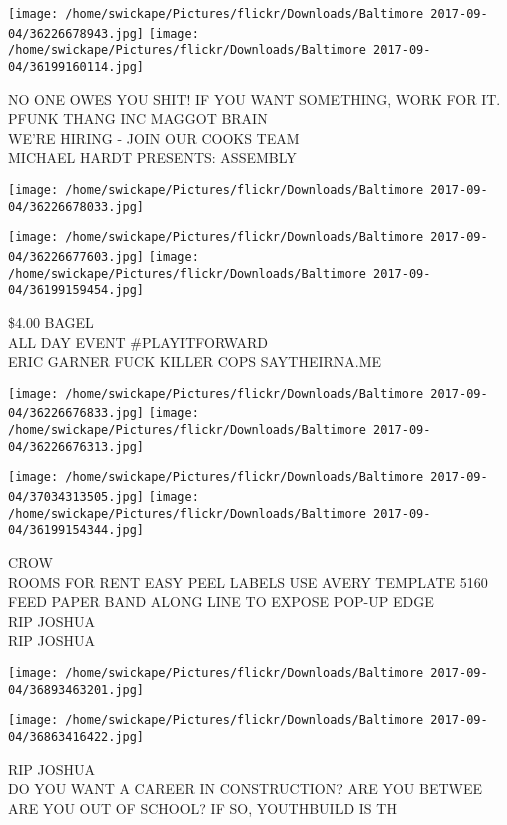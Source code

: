 \documentclass[10pt,letterpaper]{article}
\begin{document}
\texttt{[image: /home/swickape/Pictures/flickr/Downloads/Baltimore 2017-09-04/36226678943.jpg]}
\texttt{[image: /home/swickape/Pictures/flickr/Downloads/Baltimore 2017-09-04/36199160114.jpg]}

NO ONE OWES YOU SHIT!  IF YOU WANT SOMETHING, WORK FOR IT.\\
PFUNK THANG INC MAGGOT BRAIN\\
WE'RE HIRING {-} JOIN OUR COOKS TEAM\\
MICHAEL HARDT PRESENTS: ASSEMBLY
\pagebreak

\texttt{[image: /home/swickape/Pictures/flickr/Downloads/Baltimore 2017-09-04/36226678033.jpg]}

\vspace{0.25in}
\texttt{[image: /home/swickape/Pictures/flickr/Downloads/Baltimore 2017-09-04/36226677603.jpg]}
\texttt{[image: /home/swickape/Pictures/flickr/Downloads/Baltimore 2017-09-04/36199159454.jpg]}

\$4.00 BAGEL\\
ALL DAY EVENT \#PLAYITFORWARD\\
ERIC GARNER FUCK KILLER COPS SAYTHEIRNA.ME
\pagebreak

\texttt{[image: /home/swickape/Pictures/flickr/Downloads/Baltimore 2017-09-04/36226676833.jpg]}
\texttt{[image: /home/swickape/Pictures/flickr/Downloads/Baltimore 2017-09-04/36226676313.jpg]}

\texttt{[image: /home/swickape/Pictures/flickr/Downloads/Baltimore 2017-09-04/37034313505.jpg]}
\texttt{[image: /home/swickape/Pictures/flickr/Downloads/Baltimore 2017-09-04/36199154344.jpg]}

CROW\\
ROOMS FOR RENT EASY PEEL LABELS USE AVERY TEMPLATE 5160 FEED PAPER BAND ALONG LINE TO EXPOSE POP{-}UP EDGE\\
RIP JOSHUA\\
RIP JOSHUA
\pagebreak

\texttt{[image: /home/swickape/Pictures/flickr/Downloads/Baltimore 2017-09-04/36893463201.jpg]}

\vspace{0.25in}
\texttt{[image: /home/swickape/Pictures/flickr/Downloads/Baltimore 2017-09-04/36863416422.jpg]}

RIP JOSHUA\\
DO YOU WANT A CAREER IN CONSTRUCTION?  ARE YOU BETWEE  ARE YOU OUT OF SCHOOL?  IF SO, YOUTHBUILD IS TH
\pagebreak
\end{document}
